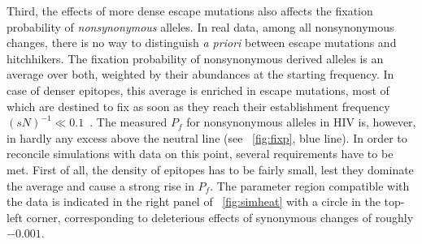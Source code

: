 \documentclass[12pt,a4paper,notitlepage,onecolumn]{article}
\begin{document}
Third, the effects of more dense escape mutations also affects the fixation
probability of {\it nonsynonymous} alleles. In real data, among all
nonsynonymous changes, there is no way to distinguish {\it a priori} between
escape mutations and hitchhikers. The fixation probability of nonsynonymous
derived alleles is an average over both, weighted by their abundances at the
starting frequency. In case of denser epitopes, this average is enriched in
escape mutations, most of which are destined to fix as soon as they reach their
establishment frequency $(sN)^{-1} \ll 0.1$~\citep{desai_beneficial_2007}. The
measured $P_f$ for nonsynonymous alleles in HIV is, however, in hardly any
excess above the neutral line (see \figurename~\ref{fig:fixp}, blue line). In
order to reconcile simulations with data on this point, several requirements
have to be met. First of all, the density of epitopes has to be fairly small,
lest they dominate the average and cause a strong rise in $P_f$. The parameter
region compatible with the data is indicated in the right panel of
\figurename~\ref{fig:simheat} with a circle in the top-left corner,
corresponding to deleterious effects of synonymous changes of roughly $-0.001$.
\end{document}
